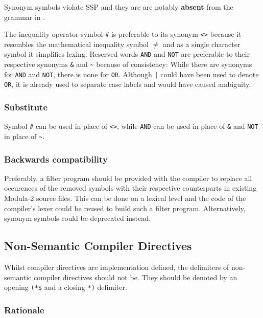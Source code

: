 \documentclass[10pt,a4paper]{article}
\begin{document}
Synonym symbols violate SSP and they are are notably \textbf{absent} from the
grammar in \cite{Wirth88}.

The inequality operator symbol \verb|#| is preferable to its synonym \verb|<>|
because it resembles the mathematical inequality symbol $\neq$ and as a single
character symbol it simplifies lexing. Reserved words \verb|AND| and \verb|NOT|
are preferable to their respective synonyms \verb|&| and \verb|~| because of
consistency: While there are synonyms for \verb|AND| and \verb|NOT|, there is
none for \verb|OR|. Although \verb!|! could have been used to denote \verb|OR|,
it is already used to separate case labels and would have caused ambiguity.

\subsubsection{Substitute}

Symbol \verb|#| can be used in place of \verb|<>|, while \verb|AND| can be used
in place of \verb|&| and \verb|NOT| in place of \verb|~|.

\subsubsection{Backwards compatibility}

Preferably, a filter program should be provided with the compiler to replace
all occurences of the removed symbols with their respective counterparts in
existing Modula-2 source files. This can be done on a lexical level and the
code of the compiler's lexer could be reused to build such a filter program.
Alternatively, synonym symbols could be deprecated instead.


\subsection{Non-Semantic Compiler Directives}

Whilst \glspl{compiler directive} are implementation defined, the delimiters of
\glspl{non-semantic compiler directive} should not be. They should be denoted
by an opening \verb|(*$| and a closing \verb|*)| delimiter.

\subsubsection{Rationale}
\end{document}
